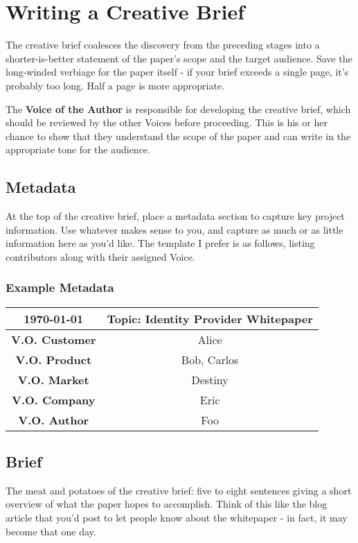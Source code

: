 \documentclass[letterpaper]{article}
\begin{document}
\section{Writing a Creative Brief}
The creative brief coalesces the discovery from the preceding stages into a shorter-is-better statement of the paper's scope and the target audience. Save the long-winded verbiage for the paper itself - if your brief exceeds a single page, it's probably too long. Half a page is more appropriate.

The \textbf{Voice of the Author} is responsible for developing the creative brief, which should be reviewed by the other Voices before proceeding. This is his or her chance to show that they understand the scope of the paper and can write in the appropriate tone for the audience.

\subsection{Metadata}
At the top of the creative brief, place a metadata section to capture key project information. Use whatever makes sense to you, and capture as much or as little information here as you'd like. The template I prefer is as follows, listing contributors along with their assigned Voice.

\subsubsection{Example Metadata}
\begin{center}
\begin{tabular}{ *{2}{|c}| } \hline
    \today & \textbf{Topic: Identity Provider Whitepaper} \\ \hline\hline
    \textbf{V.O. Customer} & Alice \\ \hline
    \textbf{V.O. Product} & Bob, Carlos \\ \hline
    \textbf{V.O. Market} & Destiny \\ \hline
    \textbf{V.O. Company} & Eric \\ \hline
    \textbf{V.O. Author} & Foo \\ \hline
\end{tabular}
\end{center}

\subsection{Brief}
The meat and potatoes of the creative brief: five to eight sentences giving a short overview of what the paper hopes to accomplish. Think of this like the blog article that you'd post to let people know about the whitepaper - in fact, it may become that one day. 
\end{document}
